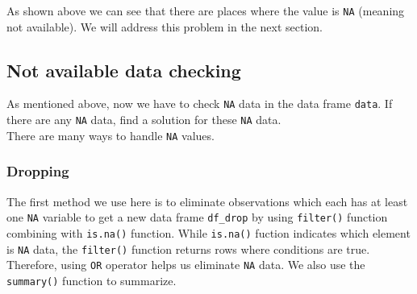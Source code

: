 \documentclass[a4paper]{article}
\begin{document}
As shown above we can see that there are places where the value is \texttt{NA} (meaning not available). We will address this problem in the next section.

\subsection{Not available data checking}

As mentioned above, now we have to check \verb|NA| data in the data frame \verb|data|. If there are any \verb|NA| data, find a solution for these \verb|NA| data.\\
There are many ways to handle \verb|NA| values.
\subsubsection{Dropping}
The first method we use here is to eliminate observations which each has at least one \verb|NA| variable to get a new data frame \verb|df_drop| by using \verb|filter()| function combining with \verb|is.na()| function. While \verb|is.na()| fuction indicates which element is \verb|NA| data, the \verb|filter()| function returns rows where conditions are true. Therefore, using \verb|OR| operator helps us eliminate \verb|NA| data. We also use the \verb|summary()| function to summarize.
\end{document}
